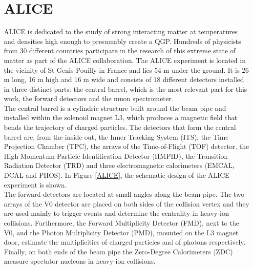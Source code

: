 \documentclass[12pt,a4paper]{report}
\begin{document}
\section{ALICE}
ALICE is dedicated to the study of strong interacting matter at temperatures and densities high enough to presumably create a QGP. Hundreds of physicists from 30 different countries participate in the research of this extreme state of matter as part of the ALICE collaboration. The ALICE experiment is located in the vicinity of St Genis-Pouilly in France and lies 54 m under the ground. It is 26 m long, 16 m high and 16 m wide and consists of 18 different detectors installed in three distinct parts: the central barrel, which is the most relevant part for this work, the forward detectors and the muon spectrometer. \\
The central barrel is a cylindric structure built around the beam pipe and installed within the solenoid magnet L3, which produces a magnetic field that bends the trajectory of charged particles. The detectors that form the central barrel are, from the inside out, the Inner Tracking System (ITS), the Time Projection Chamber (TPC), the arrays of the Time-of-Flight (TOF) detector, the High Momentum Particle Identification Detector (HMPID), the Transition Radiation Detector (TRD) and three electromagnetic calorimeters (EMCAL, DCAL and PHOS). In Figure \ref{ALICE}, the schematic design of the ALICE experiment is shown. \\
The forward detectors are located at small angles along the beam pipe. The two arrays of the V0 detector are placed on both sides of the collision vertex and they are used mainly to trigger events and determine the centrality in heavy-ion collisions. Furthermore, the Forward Multiplicity Detector (FMD), next to the V0, and the Photon Multiplicity Detector (PMD), mounted on the L3 magnet door, estimate the multiplicities of charged particles and of photons respectively. Finally, on both ends of the beam pipe the Zero-Degree Calorimeters (ZDC) measure spectator nucleons in heavy-ion collisions. \\
\end{document}
